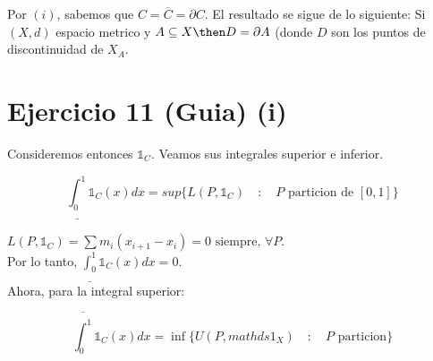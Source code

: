 \documentclass{article}
\begin{document}
\begin{Dem}
	Por $(i)$, sabemos que $C=\overline{C}=\partial C$. El resultado se sigue de lo siguiente: Si $(X,d)$ espacio metrico y $A\subseteq X \then D = \partial A$ (donde $D$ son los puntos de discontinuidad de $X_A$.

\end{Dem}

\section{Ejercicio 11 (Guia) (i)}  

\begin{Dem}
	Consideremos entonces $\mathds{1}_C$. Veamos sus integrales superior e inferior.

	\[
	\underline{\int_{0}^{1}} \mathds{1}_C(x) dx = sup \{L(P,\mathds{1}_C) \quad : \quad P \text{ particion de } [0,1] \}
	\]

	$L(P,\mathds{1}_C) = \sum m_i (x_{i+1}-x_i)=0 \text{ siempre, } \forall P$.\\

	Por lo tanto, $\underline{\int_{0}^{1}} \mathds{1}_C (x) dx =0 $.\\

	Ahora, para la integral superior:

	\[
	\overline{\int_{0}^{1}} \mathds{1}_C (x) dx = \inf \{U(P,mathds{1}_X) \quad : \quad P \text{ particion} \}
	\]
\end{Dem}







\end{document}
